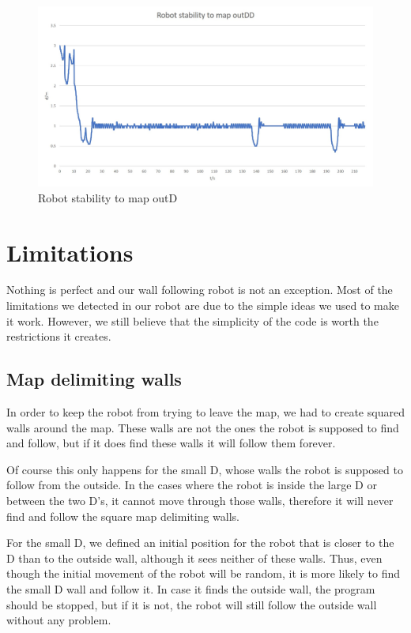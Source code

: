 \documentclass[10pt,journal,compsoc]{IEEEtran}
\begin{document}
   \begin{figure}[thpb]
      \centering
     \includegraphics[scale=0.2]{img/map_outD.jpg}
      \caption{Robot stability to map outD}
      \label{fig:result_outD_map}
   \end{figure}



\section{Limitations}

Nothing is perfect and our wall following robot is not an exception. Most of the limitations we detected in our robot are due to the simple ideas we used to make it work. However, we still believe that the simplicity of the code is worth the restrictions it creates.

\subsection{Map delimiting walls}

In order to keep the robot from trying to leave the map, we had to create squared walls around the map. These walls are not the ones the robot is supposed to find and follow, but if it does find these walls it will follow them forever.

Of course this only happens for the small D, whose walls the robot is supposed to follow from the outside. In the cases where the robot is inside the large D or between the two D's, it cannot move through those walls, therefore it will never find and follow the square map delimiting walls.

For the small D, we defined an initial position for the robot that is closer to the D than to the outside wall, although it sees neither of these walls. Thus, even though the initial movement of the robot will be random, it is more likely to find the small D wall and follow it. In case it finds the outside wall, the program should be stopped, but if it is not, the robot will still follow the outside wall without any problem.
\end{document}
